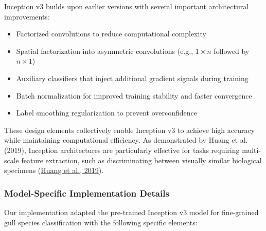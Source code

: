 \documentclass[a4paper,12pt]{report}
\begin{document}
Inception v3 builds upon earlier versions with several important architectural improvements:
\begin{itemize}
    \item Factorized convolutions to reduce computational complexity
    \item Spatial factorization into asymmetric convolutions (e.g., $1 \times n$ followed by $n \times 1$)
    \item Auxiliary classifiers that inject additional gradient signals during training
    \item Batch normalization for improved training stability and faster convergence
    \item Label smoothing regularization to prevent overconfidence
\end{itemize}

These design elements collectively enable Inception v3 to achieve high accuracy while maintaining computational efficiency. As demonstrated by Huang et al. (2019), Inception architectures are particularly effective for tasks requiring multi-scale feature extraction, such as discriminating between visually similar biological specimens (\href{https://ieeexplore.ieee.org/document/8803812}{Huang et al., 2019}).

\subsubsection{Model-Specific Implementation Details}

Our implementation adapted the pre-trained Inception v3 model for fine-grained gull species classification with the following specific elements:
\end{document}
